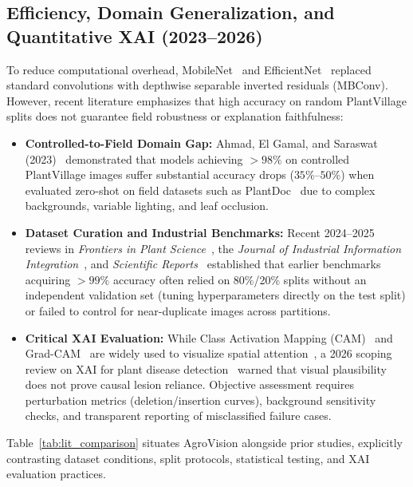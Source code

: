\documentclass[journal]{IEEEtran}
\begin{document}
\subsection{Efficiency, Domain Generalization, and Quantitative XAI (2023--2026)}
To reduce computational overhead, MobileNet~\cite{howard2017, sandler2018} and EfficientNet~\cite{tan2019} replaced standard convolutions with depthwise separable inverted residuals (MBConv). However, recent literature emphasizes that high accuracy on random PlantVillage splits does not guarantee field robustness or explanation faithfulness:
\begin{itemize}
    \item \textbf{Controlled-to-Field Domain Gap:} Ahmad, El Gamal, and Saraswat (2023)~\cite{ahmad2023} demonstrated that models achieving $>98\%$ on controlled PlantVillage images suffer substantial accuracy drops ($35\%$--$50\%$) when evaluated zero-shot on field datasets such as PlantDoc~\cite{singh2020} due to complex backgrounds, variable lighting, and leaf occlusion.
    \item \textbf{Dataset Curation and Industrial Benchmarks:} Recent 2024--2025 reviews in \textit{Frontiers in Plant Science}~\cite{lu2024frontiers}, the \textit{Journal of Industrial Information Integration}~\cite{ngugi2024jiii}, and \textit{Scientific Reports}~\cite{bench2025scirep} established that earlier benchmarks acquiring $>99\%$ accuracy often relied on 80\%/20\% splits without an independent validation set (tuning hyperparameters directly on the test split) or failed to control for near-duplicate images across partitions.
    \item \textbf{Critical XAI Evaluation:} While Class Activation Mapping (CAM)~\cite{zhou2016} and Grad-CAM~\cite{selvaraju2017} are widely used to visualize spatial attention~\cite{chen2020, chouhan2020}, a 2026 scoping review on XAI for plant disease detection~\cite{xai2026review} warned that visual plausibility does not prove causal lesion reliance. Objective assessment requires perturbation metrics (deletion/insertion curves), background sensitivity checks, and transparent reporting of misclassified failure cases.
\end{itemize}
Table~\ref{tab:lit_comparison} situates AgroVision alongside prior studies, explicitly contrasting dataset conditions, split protocols, statistical testing, and XAI evaluation practices.

\end{document}
